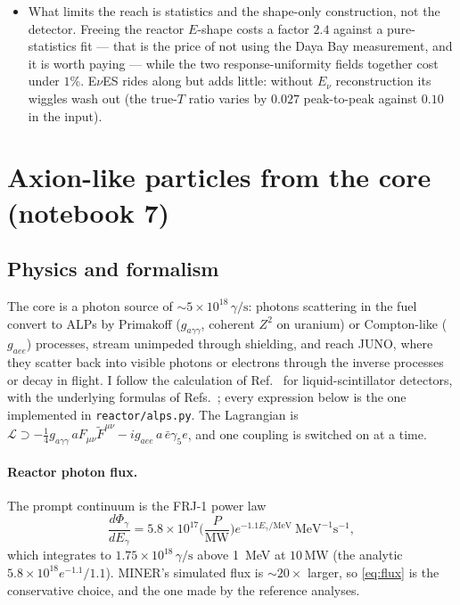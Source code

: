 \documentclass[aps,prd,superscriptaddress,nofootinbib,longbibliography,notitlepage,11pt]{revtex4-2}
\newcommand{\eves}{E$\nu$ES}
\begin{document}
\begin{itemize}
every configuration loses sensitivity entirely, as it must: a fully averaged depletion is
$L$- and $E$-independent and is therefore exactly the normalisation this analysis leaves
free.
\item What limits the reach is statistics and the shape-only construction, not the
detector.  Freeing the reactor $E$-shape costs a factor $2.4$ against a pure-statistics
fit --- that is the price of not using the Daya Bay measurement, and it is worth paying ---
while the two response-uniformity fields together cost under $1\%$.  \eves{} rides along
but adds little: without $E_\nu$ reconstruction its wiggles wash out (the true-$T$ ratio
varies by $0.027$ peak-to-peak against $0.10$ in the input).
\end{itemize}

\section{Axion-like particles from the core (notebook 7)}
\label{sec:alps}

\subsection{Physics and formalism}
\label{sec:alp_formalism}
The core is a photon source of $\sim5\times10^{18}\,\gamma/\mathrm{s}$: photons scattering
in the fuel convert to ALPs by Primakoff ($g_{a\gamma\gamma}$, coherent $Z^2$ on uranium) or
Compton-like ($g_{aee}$) processes, stream unimpeded through shielding, and reach JUNO,
where they scatter back into visible photons or electrons through the inverse processes or
decay in flight.  I follow the calculation of Ref.~\cite{AristizabalSierra:2025myf} for
liquid-scintillator detectors, with the underlying formulas of
Refs.~\cite{AristizabalSierra:2020rom,Dent:2019ueq}; every expression below is the one
implemented in \texttt{reactor/alps.py}.  The Lagrangian is
$\mathcal L\supset-\tfrac14g_{a\gamma\gamma}\,aF_{\mu\nu}\tilde F^{\mu\nu}-ig_{aee}\,a\,\bar e\gamma_5e$,
and one coupling is switched on at a time.

\paragraph{Reactor photon flux.}
The prompt continuum is the FRJ-1 power law \cite{Bechteler:1984,AristizabalSierra:2020rom}
\begin{equation}
\frac{d\Phi_\gamma}{dE_\gamma}=5.8\times10^{17}\Big(\frac{P}{\mathrm{MW}}\Big)
e^{-1.1E_\gamma/\mathrm{MeV}}\ \mathrm{MeV^{-1}s^{-1}},
\label{eq:flux}
\end{equation}
which integrates to $1.75\times10^{18}\,\gamma/\mathrm{s}$ above 1~MeV at $10\,\mathrm{MW}$
(the analytic $5.8\times10^{18}e^{-1.1}/1.1$).  MINER's simulated flux is $\sim20\times$
larger, so \cref{eq:flux} is the conservative choice, and the one made by the reference
analyses.
\end{document}
